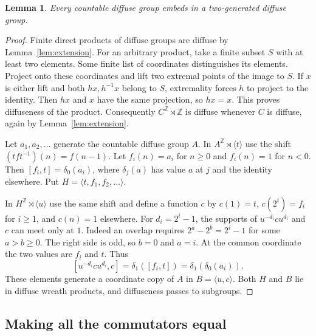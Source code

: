 \documentclass[11pt,a4paper]{article}
\newtheorem{lemma}[theorem]{Lemma}
\numberwithin{equation}{section}
\newcommand{\Z}{\mathbb Z}
\begin{document}
\begin{lemma}\label{lem:uniform-packing}
Every countable diffuse group embeds in a two-generated diffuse group.
\end{lemma}
\begin{proof}
Finite direct products of diffuse groups are diffuse by Lemma~\ref{lem:extension}. For an arbitrary product, take a finite subset \(S\) with at least two elements. Some finite list of coordinates distinguishes its elements. Project onto these coordinates and lift two extremal points of the image to \(S\). If \(x\) is either lift and both \(hx,h^{-1}x\) belong to \(S\), extremality forces \(h\) to project to the identity. Then \(hx\) and \(x\) have the same projection, so \(hx=x\). This proves diffuseness of the product. Consequently \(C^{\Z}\rtimes\Z\) is diffuse whenever \(C\) is diffuse, again by Lemma~\ref{lem:extension}.

Let \(a_1,a_2,\ldots\) generate the countable diffuse group \(A\). In \(A^{\Z}\rtimes\langle t\rangle\) use the shift \((tft^{-1})(n)=f(n-1)\). Let \(f_i(n)=a_i\) for \(n\ge0\) and \(f_i(n)=1\) for \(n<0\). Then \([f_i,t]=\delta_0(a_i)\), where \(\delta_j(a)\) has value \(a\) at \(j\) and the identity elsewhere. Put \(H=\langle t,f_1,f_2,\ldots\rangle\).

In \(H^\Z\rtimes\langle u\rangle\) use the same shift and define a function \(c\) by \(c(1)=t\), \(c(2^i)=f_i\) for \(i\ge1\), and \(c(n)=1\) elsewhere. For \(d_i=2^i-1\), the supports of \(u^{-d_i}cu^{d_i}\) and \(c\) can meet only at \(1\). Indeed an overlap requires \(2^a-2^b=2^i-1\) for some \(a>b\ge0\). The right side is odd, so \(b=0\) and \(a=i\). At the common coordinate the two values are \(f_i\) and \(t\). Thus
\[
 [u^{-d_i}cu^{d_i},c]=\delta_1([f_i,t])=\delta_1(\delta_0(a_i)).
\]
These elements generate a coordinate copy of \(A\) in \(B=\langle u,c\rangle\). Both \(H\) and \(B\) lie in diffuse wreath products, and diffuseness passes to subgroups.
\end{proof}

\subsection{Making all the commutators equal}
\end{document}
